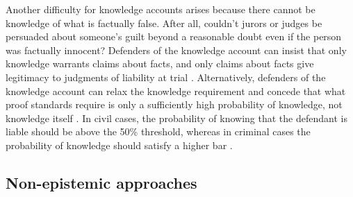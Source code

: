 \documentclass{article}
\begin{document}
Another difficulty for knowledge accounts arises because there cannot be knowledge of what is factually false. %
After all, couldn't jurors or judges be persuaded about someone's guilt  beyond a reasonable doubt even if the person was factually innocent?
Defenders of the knowledge account can insist that
only knowledge warrants claims about facts, and only claims about facts
give legitimacy to judgments of  liability at trial \citep{levanon2019}. 
Alternatively, defenders of the knowledge account can relax the knowledge requirement and concede that what proof standards require is only a sufficiently high probability of knowledge, not knowledge itself \citep{BlomeTillmann2017}. 
In civil cases, the probability of knowing that the defendant is liable should be above the 50\% threshold, whereas in criminal cases the probability of knowledge should satisfy a higher bar \citep{BlomeTillmann2017}. 





\subsection{Non-epistemic approaches}
\label{subsec:non-epist}
\end{document}
